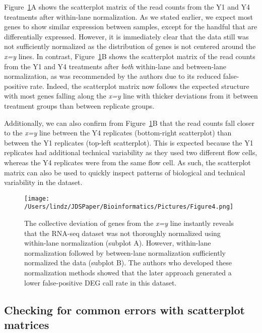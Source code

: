 \documentclass[referee]{biom}
\begin{document}
Figure~\ref{withinbtwn}A shows the scatterplot matrix of the read counts from the Y1 and Y4 treatments after within-lane normalization. As we stated earlier, we expect most genes to show similar expression between samples, except for the handful that are differentially expressed. However, it is immediately clear that the data still was not sufficiently normalized as the distribution of genes is not centered around the \textit{x=y} lines. In contrast, Figure~\ref{withinbtwn}B shows the scatterplot matrix of the read counts from the Y1 and Y4 treatments after \textit{both} within-lane and between-lane normalization, as was recommended by the authors due to its reduced false-positive rate. Indeed, the scatterplot matrix now follows the expected structure with most genes falling along the \textit{x=y} line with thicker deviations from it between treatment groups than between replicate groups.

Additionally, we can also confirm from Figure~\ref{withinbtwn}B that the read counts fall closer to the \textit{x=y} line between the Y4 replicates (bottom-right scatterplot) than between the Y1 replicates (top-left scatterplot). This is expected because the Y1 replicates had additional technical variability as they used two different flow cells, whereas the Y4 replicates were from the same flow cell. As such, the scatterplot matrix can also be used to quickly inspect patterns of biological and technical variability in the dataset.

\begin{figure}
\begin{center}
\centerline{\texttt{[image: /Users/lindz/JDSPaper/Bioinformatics/Pictures/Figure4.png]}}
\end{center}
\caption{The collective deviation of genes from the \textit{x=y} line instantly reveals that the RNA-seq dataset was not thoroughly normalized using within-lane normalization (subplot A). However, within-lane normalization followed by between-lane normalization sufficiently normalized the data (subplot B). The authors who developed these normalization methods showed that the later approach generated a lower false-positive DEG call rate in this dataset.
\label{withinbtwn}}
\end{figure}

\subsection{Checking for common errors with scatterplot matrices}
\label{s:Checking for common errors with scatterplot matrices}
\end{document}
